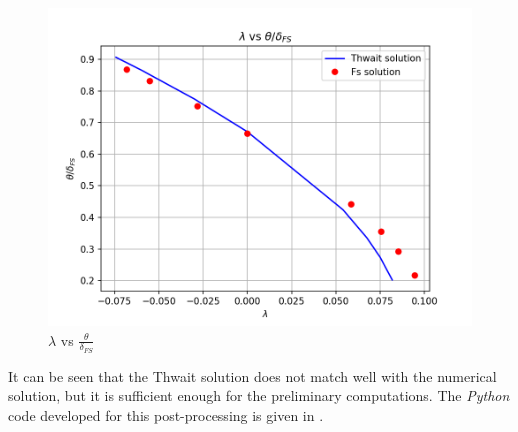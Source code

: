 \begin{figure}
   \centering
    \includegraphics[scale=0.5]{supporting_documents/02_question_2_and_3_codeDevelopment/03_postProcessing/lambda_vs_theta_dFS_thwait.png}
    \caption{ $\lambda$ vs $\frac{\theta}{\delta_{FS}}$}
    \label{plot_a_5}
\end{figure}

\par It can be seen that the Thwait solution does not match well with the
numerical solution, but it is sufficient enough for the preliminary
computations. The \emph{Python} code developed for this post-processing
is given in .

\pagebreak
